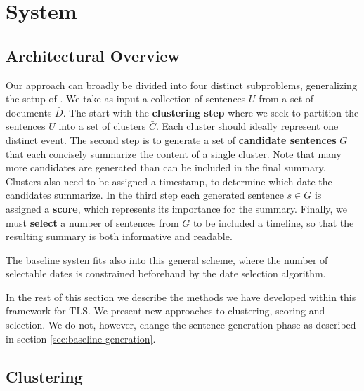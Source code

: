 \documentclass[a4paper,BCOR=10mm]{report}
\begin{document}

\chapter{System}

\section{Architectural Overview}

Our approach can broadly be divided into four distinct subproblems, generalizing the setup of \citet{banerjee}.
We take as input a collection of sentences $U$ from a set of documents $\bar{D}$.
The start with the \textbf{clustering step} where we seek to partition the sentences $U$ into a set of clusters $\bar{C}$. Each cluster should ideally represent one distinct event.
The second step is to generate a set of \textbf{candidate sentences} $G$ that each concisely summarize the content of a single cluster. Note that many more candidates are generated than can be included in the final summary. Clusters also need to be assigned a timestamp, to determine which date the candidates summarize.
In the third step each generated sentence $s \in G$ is assigned a \textbf{score}, which represents its importance for the summary.
Finally, we must \textbf{select} a number of sentences from $G$ to be included a timeline, so that the resulting summary is both informative and readable.

The baseline systen fits also into this general scheme, where the number of selectable dates is constrained beforehand by the date selection algorithm.

In the rest of this section we describe the methods we have developed within this framework for TLS. We present new approaches to clustering, scoring and selection. We do not, however, change the sentence generation phase as described in section \ref{sec:baseline-generation}.

\section{Clustering}
\end{document}
